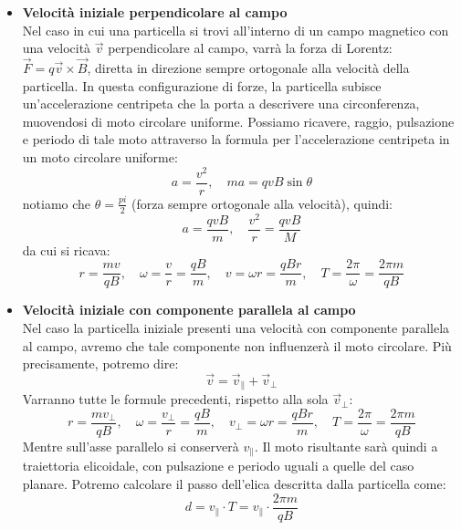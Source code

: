 \documentclass[a4paper,12pt]{article}
\begin{document}
\begin{itemize}
  \item \textbf{Velocità iniziale perpendicolare al campo} \\
    Nel caso in cui una particella si trovi all'interno di un campo magnetico con una velocità $\vec{v}$ perpendicolare al campo, varrà la forza
    di Lorentz: $\vec{F} = q\vec{v} \times \vec{B}$, diretta in direzione sempre ortogonale alla velocità della particella. In questa configurazione di
    forze, la particella subisce un'accelerazione centripeta che la porta a descrivere una circonferenza, muovendosi di moto circolare uniforme. Possiamo
    ricavere, raggio, pulsazione e periodo di tale moto attraverso la formula per l'accelerazione centripeta in un moto circolare uniforme:
    $$ a = \frac{v^2}{r}, \quad ma = qvB\sin{\theta} $$
    notiamo che $\theta = \frac{pi}{2}$ (forza sempre ortogonale alla velocità), quindi:
    $$ a = \frac{qvB}{m}, \quad \frac{v^2}{r} = \frac{qvB}{M} $$
    da cui si ricava:
    $$ r = \frac{mv}{qB}, \quad \omega = \frac{v}{r} = \frac{qB}{m}, \quad v = \omega r = \frac{qBr}{m}, \quad T = \frac{2\pi}{\omega} = \frac{2\pi m}{qB} $$
  \item \textbf{Velocità iniziale con componente parallela al campo} \\
    Nel caso la particella iniziale presenti una velocità con componente parallela al campo, avremo che tale componente non influenzerà
    il moto circolare. Più precisamente, potremo dire:
    $$ \vec{v} = \vec{v}_\parallel + \vec{v}_\perp $$
    Varranno tutte le formule precedenti, rispetto alla sola $\vec{v}_\perp$:
    $$ r = \frac{mv_\perp}{qB}, \quad \omega = \frac{v_\perp}{r} = \frac{qB}{m}, \quad v_\perp = \omega r = \frac{qBr}{m}, \quad T = \frac{2\pi}{\omega} = \frac{2\pi m}{qB} $$
    Mentre sull'asse parallelo si conserverà $v_\parallel$. Il moto risultante sarà quindi a traiettoria elicoidale, con pulsazione e periodo
    uguali a quelle del caso planare. Potremo calcolare il passo dell'elica descritta dalla particella come:
    $$ d = v_\parallel \cdot T = v_\parallel \cdot \frac{2\pi m}{qB} $$
\end{itemize}
\end{document}
